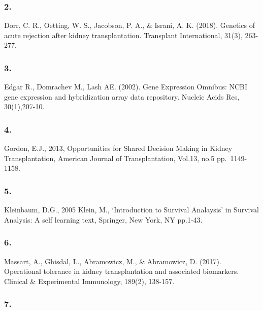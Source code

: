 \documentclass[a4paper,9pt,twocolumn,twoside,]{pinp}
\begin{document}
\hypertarget{section-1}{%
\subsubsection{2.}\label{section-1}}

Dorr, C. R., Oetting, W. S., Jacobson, P. A., \& Israni, A. K. (2018).
Genetics of acute rejection after kidney transplantation. Transplant
International, 31(3), 263-277.

\hypertarget{section-2}{%
\subsubsection{3.}\label{section-2}}

Edgar R., Domrachev M., Lash AE. (2002). Gene Expression Omnibus: NCBI
gene expression and hybridization array data repository. Nucleic Acids
Res, 30(1),207-10.

\hypertarget{section-3}{%
\subsubsection{4.}\label{section-3}}

Gordon, E.J., 2013, Opportunities for Shared Decision Making in Kidney
Transplantation, American Journal of Transplantation, Vol.13, no.5
pp.~1149-1158.

\hypertarget{section-4}{%
\subsubsection{5.}\label{section-4}}

Kleinbaum, D.G., 2005 Klein, M., `Introduction to Survival Analaysis' in
Survival Analysis: A self learning text, Springer, New York, NY pp.1-43.

\hypertarget{section-5}{%
\subsubsection{6.}\label{section-5}}

Massart, A., Ghisdal, L., Abramowicz, M., \& Abramowicz, D. (2017).
Operational tolerance in kidney transplantation and associated
biomarkers. Clinical \& Experimental Immunology, 189(2), 138-157.

\hypertarget{section-6}{%
\subsubsection{7.}\label{section-6}}
\end{document}
